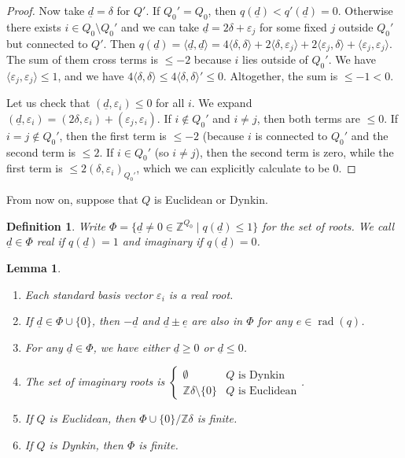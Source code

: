 \documentclass{book}
\newtheorem{lemma}[theorem]{Lemma}
\newtheorem{definition}[theorem]{Definition}
\newcommand{\defterm}{\emph}
\DeclareMathOperator{\rad}{rad}
\begin{document}
\begin{proof}
Now take $\underline d = \delta$ for $Q'$. If $Q_0' = Q_0$, then $q(\underline d) < q'(\underline d) = 0$. Otherwise there exists $i \in Q_0 \setminus Q_0'$ and we can take $\underline d = 2\delta + \varepsilon_j$ for some fixed $j$ outside $Q_0'$ but connected to $Q'$. Then $q(\underline d) = \langle \underline d, \underline d \rangle = 4 \langle \delta, \delta \rangle + 2 \langle \delta, \varepsilon_j \rangle + 2 \langle \varepsilon_j, \delta \rangle + \langle \varepsilon_j, \varepsilon_j \rangle$. The sum of them cross terms is $\leq -2$ because $i$ lies outside of $Q_0'$. We have $\langle \varepsilon_j, \varepsilon_j \rangle \leq 1$, and we have $4 \langle \delta, \delta \rangle \leq 4\langle \delta, \delta \rangle' \leq 0$. Altogether, the sum is $\leq -1 < 0$.

Let us check that $(\underline d, \varepsilon_i) \leq 0$ for all $i$. We expand $(\underline d, \varepsilon_i) = (2\delta,\varepsilon_i) + (\varepsilon_j,\varepsilon_i)$. If $i \not \in Q_0'$ and $i \neq j$, then both terms are $\leq 0$. If $i=j \not \in Q_0'$, then the first term is $\leq -2$ (because $i$ is connected to $Q_0'$ and the second term is $\leq 2$. If $i \in Q_0'$ (so $i\neq j$), then the second term is zero, while the first term is $\leq 2(\delta, \varepsilon_i)_{Q_0'}$, which we can explicitly calculate to be 0.
\end{proof}

From now on, suppose that $Q$ is Euclidean or Dynkin.

\begin{definition}
Write $\Phi = \{\underline d \neq 0 \in \mathbb{Z}^{Q_0} \mid q(\underline d) \leq 1\}$ for the set of \defterm{roots}. We call $\underline d \in \Phi$ \defterm{real} if $q(\underline d) = 1$ and \defterm{imaginary} if $q(\underline d) = 0$.
\end{definition}

\begin{lemma}
\begin{enumerate}
	\item Each standard basis vector $\varepsilon_i$ is a real root.
	\item If $\underline d \in \Phi \cup \{0\}$, then $-\underline d$ and $\underline d \pm \underline e$ are also in $\Phi$ for any $e \in \rad(q)$. 
	\item For any $\underline d \in \Phi$, we have either $\underline d \geq 0$ or $\underline d \leq 0$.
	\item The set of imaginary roots is $\begin{cases} \emptyset & Q \text{ is Dynkin} \\ \mathbb{Z}\delta \setminus \{0\} & Q \text{ is Euclidean} \end{cases}$.
	\item If $Q$ is Euclidean, then $\Phi \cup \{0\} / \mathbb Z \delta$ is finite.
	\item If $Q$ is Dynkin, then $\Phi$ is finite.
\end{enumerate}
\end{lemma}
\end{document}
